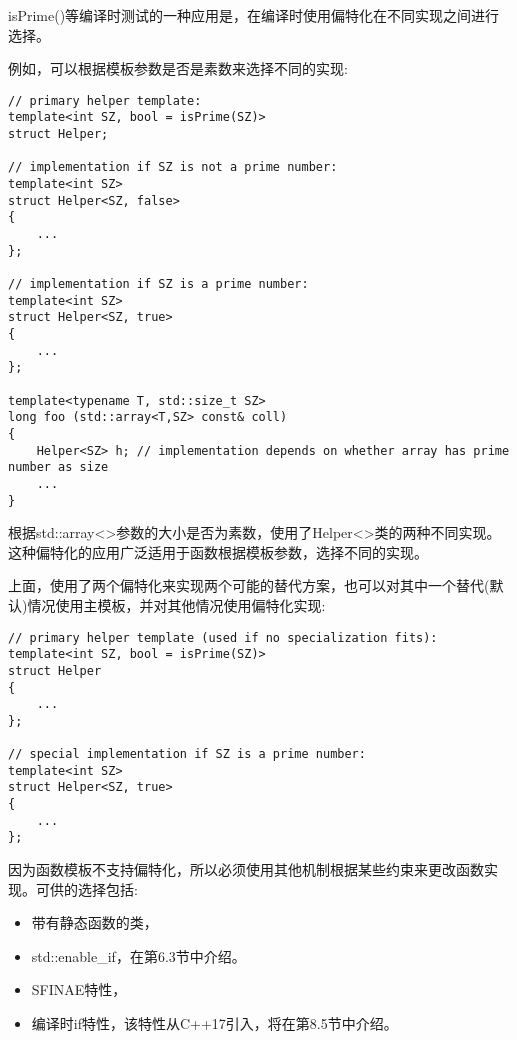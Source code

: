 isPrime()等编译时测试的一种应用是，在编译时使用偏特化在不同实现之间进行选择。

例如，可以根据模板参数是否是素数来选择不同的实现:

\begin{lstlisting}[style=styleCXX]
// primary helper template:
template<int SZ, bool = isPrime(SZ)>
struct Helper;

// implementation if SZ is not a prime number:
template<int SZ>
struct Helper<SZ, false>
{
	...
};

// implementation if SZ is a prime number:
template<int SZ>
struct Helper<SZ, true>
{
	...
};

template<typename T, std::size_t SZ>
long foo (std::array<T,SZ> const& coll)
{
	Helper<SZ> h; // implementation depends on whether array has prime number as size
	...
}
\end{lstlisting}

根据std::array<>参数的大小是否为素数，使用了Helper<>类的两种不同实现。这种偏特化的应用广泛适用于函数根据模板参数，选择不同的实现。

上面，使用了两个偏特化来实现两个可能的替代方案，也可以对其中一个替代(默认)情况使用主模板，并对其他情况使用偏特化实现:

\begin{lstlisting}[style=styleCXX]
// primary helper template (used if no specialization fits):
template<int SZ, bool = isPrime(SZ)>
struct Helper
{
	...
};

// special implementation if SZ is a prime number:
template<int SZ>
struct Helper<SZ, true>
{
	...
};
\end{lstlisting}

因为函数模板不支持偏特化，所以必须使用其他机制根据某些约束来更改函数实现。可供的选择包括:

\begin{itemize}
\item 
带有静态函数的类，

\item 
std::enable\_if，在第6.3节中介绍。

\item 
SFINAE特性，

\item 
编译时if特性，该特性从C++17引入，将在第8.5节中介绍。
\end{itemize}

